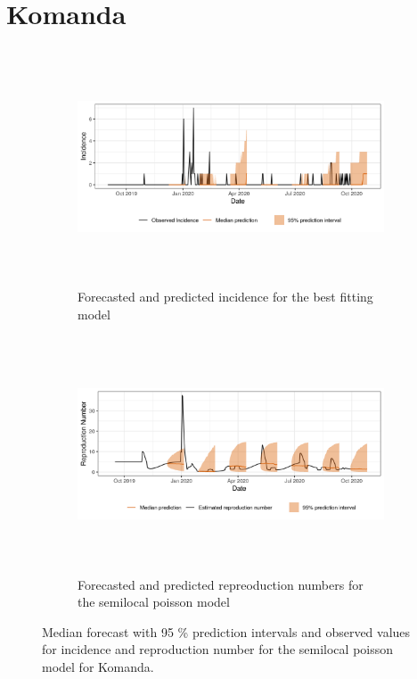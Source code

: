  \section{ Komanda }\begin{figure}[H]\begin{subfigure}{\textwidth}  \centering  \includegraphics[width=0.9\linewidth, height=7cm]{../output/Komanda_predictions.png}  \caption{Forecasted and predicted incidence for the best fitting model}\end{subfigure}

\begin{subfigure}{\textwidth}  \centering  \includegraphics[width=0.9\linewidth, height=7cm]{../output/Komanda_Rs.png}  \caption{Forecasted and predicted repreoduction numbers for the semilocal poisson model}\end{subfigure}  \caption{Median forecast with 95 \% prediction intervals and observed values for incidence and reproduction number for the semilocal poisson model for Komanda.}\end{figure}


